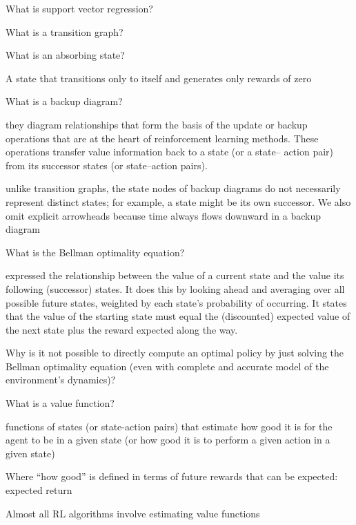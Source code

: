 \documentclass[10pt]{article}
\begin{document}
What is support vector regression?

\hrulefill

What is a transition graph?


\hrulefill

What is an absorbing state?

A state that transitions only to itself and generates only rewards of zero

\hrulefill

What is a backup diagram?

they diagram relationships that form the basis of the update or backup operations that are at the heart of reinforcement learning methods. These operations transfer value information back to a state (or a state– action pair) from its successor states (or state–action pairs).

unlike transition graphs, the state nodes of backup diagrams do not necessarily represent distinct states; for example, a state might be its own successor. We also omit explicit arrowheads because time always flows downward in a backup diagram


\hrulefill

What is the Bellman optimality equation?

expressed the relationship between the value of a current state and the value its following (successor) states. It does this by looking ahead and averaging over all possible future states, weighted by each state's probability of occurring. 
It states that the value of the starting state must equal the (discounted) expected value of the next state plus the reward expected along the way.

\hrulefill

Why is it not possible to directly compute an optimal policy by just solving the Bellman optimality equation (even with complete and accurate model of the environment's dynamics)?

\hrulefill

What is a value function?

functions of states (or state-action pairs) that estimate how good it is for the agent to be in a given state (or how good it is to perform a given action in a given state)

Where ``how good'' is defined in terms of future rewards that can be expected: expected return

Almost all RL algorithms involve estimating value functions

\hrulefill
\end{document}
